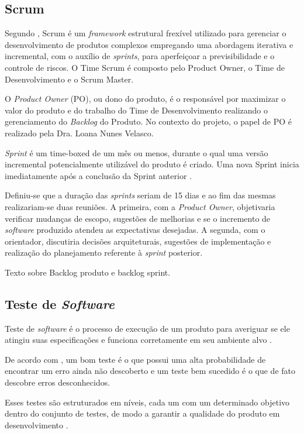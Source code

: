     \subsection{Scrum}
    Segundo \cite{scrum_guide}, Scrum é um \textit{framework} estrutural frexível utilizado
    para gerenciar o desenvolvimento de produtos complexos empregando uma abordagem iterativa
    e incremental, com o auxílio de \textit{sprints}, para aperfeiçoar a previsibilidade e o controle de riscos. O Time Scrum é composto pelo Product Owner, o Time de Desenvolvimento e o Scrum Master.

    O \textit{Product Owner} (PO), ou dono do produto, é o responsável por maximizar o valor
    do produto e do trabalho do Time de Desenvolvimento realizando o gerenciamento
    do \textit{Backlog} do Produto. No contexto do projeto, o papel de PO é realizado pela
    Dra. Loana Nunes Velasco.

    \textit{Sprint} é um time-boxed de um mês ou menos, durante o qual
    uma versão incremental potencialmente utilizável do produto é criado.
    Uma nova Sprint inicia imediatamente após a conclusão da Sprint anterior \cite{scrum_guide}.

    Definiu-se que a duração das \textit{sprints} seriam de 15 dias e ao fim das mesmas
    realizariam-se duas reuniões. A primeira, com a \textit{Product Owner}, objetivaria verificar mudanças de escopo, sugestões de melhorias e se o incremento de \textit{software} produzido atendeu as expectativas desejadas. A segunda,
    com o orientador, discutiria decisões arquiteturais, sugestões de implementação e realização
    do planejamento referente à \textit{sprint} posterior.

    Texto sobre Backlog produto e backlog sprint.

    \subsection{Teste de \textit{Software}}
    Teste de \textit{software} é o processo de execução de um produto para averiguar se ele atingiu suas especificações e funciona corretamente em seu ambiente alvo \cite{artigo_intro_teste}.

    De acordo com , um bom teste é o que possui uma alta probabilidade de encontrar um erro ainda não descoberto e um teste bem sucedido é o que de fato descobre erros desconhecidos.

    Esses testes são estruturados em níveis, cada um com um determinado objetivo dentro do conjunto de testes, de modo a garantir a qualidade do produto em desenvolvimento \cite{sw_test_tech}.

